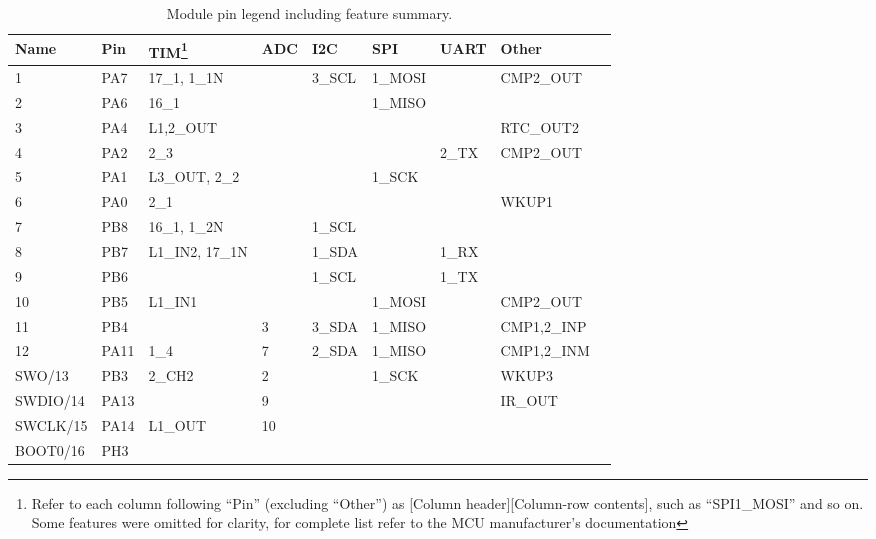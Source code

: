 \begin{table}[H]
\begin{center}
\caption{\label{table:module-pin-legend}Module pin legend including feature summary.}
    \begin{tabular}{|l|l|l|l|l|l|l|l|l|} \hline
    \textbf{Name} & \textbf{Pin} & \textbf{TIM\footnote{Refer to each column following ``Pin'' (excluding ``Other'') as [Column header][Column-row contents], such as ``SPI1\_MOSI'' and so on. Some features were omitted for clarity, for complete list refer to the MCU manufacturer's documentation}} & \textbf{ADC} & \textbf{I2C} & \textbf{SPI} & \textbf{UART} & \textbf{Other}\\ \hline
    1        & PA7  & 17\_1, 1\_1N    &     & 3\_SCL & 1\_MOSI &             & CMP2\_OUT          \\ \hline
    2        & PA6  & 16\_1          &     &       & 1\_MISO &             &                    \\ \hline
    3        & PA4  & L1,2\_OUT      &     &       &        &             & RTC\_OUT2           \\ \hline
    4        & PA2  & 2\_3           &     &       &        & 2\_TX & CMP2\_OUT           \\ \hline
    5        & PA1  & L3\_OUT, 2\_2   &     &       & 1\_SCK  &             &                    \\ \hline
    6        & PA0  & 2\_1           &     &       &        &             & WKUP1   \\ \hline
    7        & PB8  & 16\_1, 1\_2N    &     & 1\_SCL &        &             &                    \\ \hline
    8        & PB7  & L1\_IN2, 17\_1N &     & 1\_SDA &        & 1\_RX        &                    \\ \hline
    9        & PB6  &               &     & 1\_SCL &        & 1\_TX        &                    \\ \hline
    10       & PB5  & L1\_IN1        &     &       & 1\_MOSI &             & CMP2\_OUT          \\ \hline
    11       & PB4  &               & 3   & 3\_SDA & 1\_MISO &             & CMP1,2\_INP        \\ \hline
    12       & PA11 & 1\_4           & 7   & 2\_SDA & 1\_MISO &             & CMP1,2\_INM        \\ \hline
    SWO/13   & PB3  & 2\_CH2         & 2   &       & 1\_SCK  &             & WKUP3 \\ \hline
    SWDIO/14 & PA13 &               & 9   &       &        &             & IR\_OUT             \\ \hline
    SWCLK/15 & PA14 & L1\_OUT        & 10  &       &        &             &                    \\ \hline
    BOOT0/16 & PH3  &               &     &       &        &             &                    \\ \hline
    \end{tabular}
\end{center}
\end{table}

